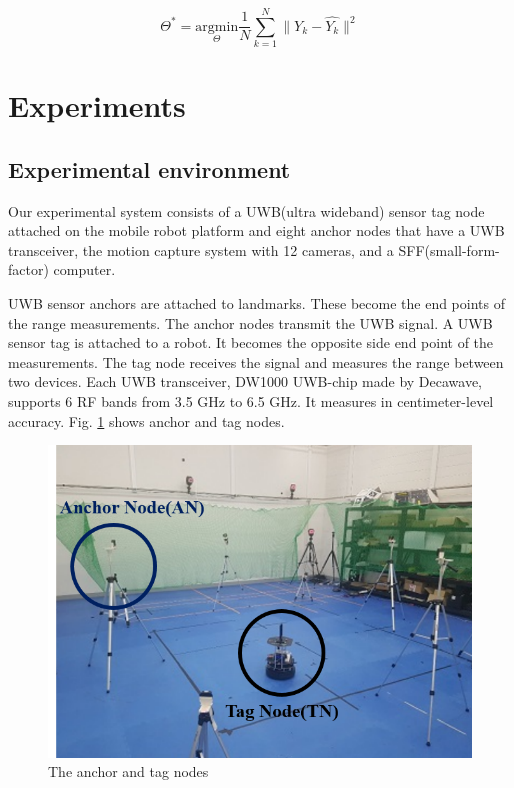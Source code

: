 \documentclass[letterpaper, 10 pt, conference]{ieeeconf}  %
\begin{document}
\begin{equation}
\Theta^{*} = \underset{\Theta}{\mathrm{argmin}} \frac{1}{N} \sum_{k=1}^N \parallel Y_k - \hat{Y_k} \parallel^{2}
\end{equation}  


\section{Experiments}
\subsection{Experimental environment}

Our experimental system consists of a UWB(ultra wideband) sensor tag node attached on the mobile robot platform and eight anchor nodes that have a UWB transceiver, the motion capture system with 12 cameras, and a SFF(small-form-factor) computer.

UWB sensor anchors are attached to landmarks. These become the end points of the range measurements. The anchor nodes transmit the UWB signal. A UWB sensor tag is attached to a robot. It becomes the opposite side end point of the measurements. The tag node receives the signal and measures the range between two devices. Each UWB transceiver, DW1000 UWB-chip made by Decawave, supports 6 RF bands from 3.5 GHz to 6.5 GHz. It measures in centimeter-level accuracy. Fig. \ref{fig:anchor_tag_nodes} shows anchor and tag nodes.

\begin{figure}[h!]
	\centering
	\includegraphics[width=.9\linewidth]{image/anchor_tag_nodes}
	\caption{The anchor and tag nodes}
	\label{fig:anchor_tag_nodes}
\end{figure}
\end{document}
